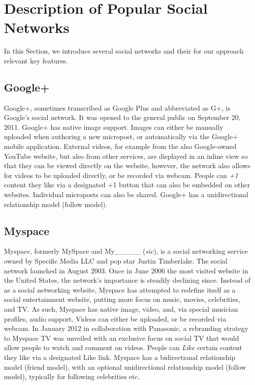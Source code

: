 \section{Description of Popular Social Networks}
In this Section, we introduce several social networks
and their for our approach relevant key features.

\subsection{Google+}
Google+, sometimes transcribed as Google Plus and abbreviated as G+, is Google's social network.
It was opened to the general public on September 20, 2011.
Google+ has native image support.
Images can either be manually uploaded when authoring a new micropost,
or automatically via the Google+ mobile application.
External videos, for example from the also Google-owned YouTube website,
but also from other services, are displayed in an inline view
so that they can be viewed directly on the website,
however, the network also allows for videos to be uploaded directly,
or be recorded via webcam.
People can \emph{+1} content they like via a designated +1 button
that can also be embedded on other websites.
Individual microposts can also be shared.
Google+ has a unidirectional relationship model (follow model).

\subsection{Myspace}
Myspace, formerly MySpace and My\_\_\_\_\_ (\emph{sic}), is a social networking service owned by Specific Media LLC and pop star Justin Timberlake.
The social network launched in August 2003.
Once in June 2006 the most visited website in the United States, the network's importance
is steadily declining since.
Instead of as a social networking website,
Myspace has attempted to redefine itself as a social entertainment website,
putting more focus on music, movies, celebrities, and TV.
As such, Myspace has native image, video, and, via special musician profiles, audio support.
Videos can either be uploaded, or be recorded via webcam.
In January 2012 in collaboration with Panasonic, a rebranding strategy to Myspace TV was unveiled
with an exclusive focus on social TV that would allow people  to watch and comment on videos.
People can \emph{Like} certain content they like via a designated Like link.
Myspace has a bidirectional relationship model (friend model),
with an optional unidirectional relationship model (follow model),
typically for following celebrities etc.

